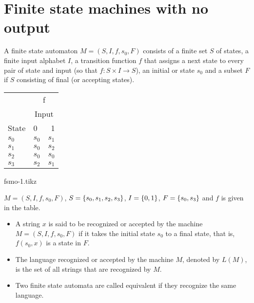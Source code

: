 \documentclass[../main-sheet.tex]{subfiles}
\begin{document}
\section{Finite state machines with no output}
A finite state automaton $ M=(S,I,f,s_0,F) $ consists of a finite set $ S $ of states, a finite input alphabet $ I $, a transition function $ f $ that assigns a next state to every pair of state and input (so that $ f:S\times I\to S $), an initial or state $ s_0 $ and a subset $ F $ if $ S $ consisting of final (or accepting states).
\begin{table}[H]
    \begin{minipage}[c]{0.38\linewidth}
        \centering
        \begin{tabular}{@{}llr@{}}
            \toprule
                    & \multicolumn{2}{c}{f}               \\ \cmidrule(l){2-3}
                    & \multicolumn{2}{c}{Input}           \\
            State   & 0                         & 1       \\ \midrule
            $s_0$   & $ s_0 $                   & $ s_1 $ \\
            $ s_1 $ & $ s_0 $                   & $ s_2 $ \\
            $ s_2 $ & $ s_0 $                   & $ s_0 $ \\
            $ s_3 $ & $ s_2 $                   & $ s_1 $ \\ \bottomrule
        \end{tabular}
    \end{minipage}\hfill
    \begin{minipage}[c]{0.58\linewidth}
        \centering
        {fsmo-1.tikz}
    \end{minipage}
\end{table}
$ M=(S,I,f,s_0,F) $, $ S=\left\{s_0,s_1,s_2,s_3\right\} $, $ I=\left\{0,1\right\} $, $ F=\left\{s_0,s_3\right\} $ and $ f $ is given in the table.
\begin{itemize}
    \item A string $ x $ is said to be recognized or accepted by the machine $ M=(S,I,f,s_0,F) $ if it takes the initial state $ s_0 $ to a final state, that is, $ f(s_0,x) $ is a state in $ F $.
    \item The language recognized or accepted by the machine $ M $, denoted by $ L(M) $, is the set of all strings that are recognized by $ M $.
    \item Two finite state automata are called equivalent if they recognize the same language.
\end{itemize}
\end{document}
